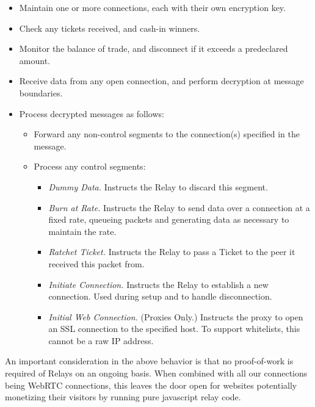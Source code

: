 \documentclass{article}
\begin{document}
\begin{itemize}
\item Maintain one or more connections, each with their own encryption key.
\item Check any tickets received, and cash-in winners.
\item Monitor the balance of trade, and disconnect if it exceeds a
  predeclared amount.
\item Receive data from any open connection, and perform decryption at
  message boundaries.
\item Process decrypted messages as follows:
  \begin{itemize}
  \item Forward any non-control segments to the connection(s)
    specified in the message.
  \item Process any control segments:
    \begin{itemize}
    \item \emph{Dummy Data.} Instructs the Relay to discard this segment.
    \item \emph{Burn at Rate.} Instructs the Relay to send data over a
      connection at a fixed rate, queueing packets and generating data
      as necessary to maintain the rate.
    \item \emph{Ratchet Ticket.} Instructs the Relay to pass a Ticket to
      the peer it received this packet from.
    \item \emph{Initiate Connection.} Instructs the Relay to establish a
      new connection. Used during setup and to handle disconnection.
    \item \emph{Initial Web Connection.} (Proxies Only.) Instructs the
      proxy to open an SSL connection to the specified host. To
      support whitelists, this cannot be a raw IP address.
    \end{itemize}
  \end{itemize}
\end{itemize}


An important consideration in the above behavior is that no
proof-of-work is required of Relays on an ongoing basis. When combined
with all our connections being WebRTC connections, this leaves the
door open for websites potentially monetizing their visitors by
running pure javascript relay code.
\end{document}
